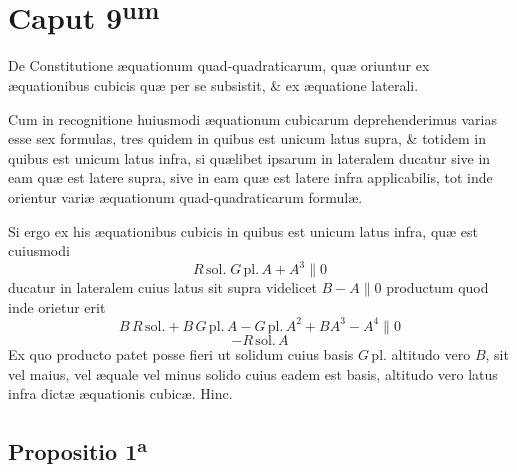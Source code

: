 \documentclass[11pt,a4paper]{article}
\begin{document}

\section*{Caput 9\textsuperscript{um}}

De Constitutione æquationum quad-quadraticarum, quæ oriuntur ex æquationibus cubicis quæ per se subsistit, \& ex æquatione laterali.

Cum in recognitione huiusmodi æquationum cubicarum deprehenderimus varias esse sex formulas, tres quidem in quibus est unicum latus supra, \& totidem in quibus est unicum latus infra, si quælibet ipsarum in lateralem ducatur sive in eam quæ est latere supra, sive in eam quæ est latere infra applicabilis, tot inde orientur variæ æquationum quad-quadraticarum formulæ.

Si ergo \struck{\ill{}}  ex his æquationibus cubicis in quibus est unicum latus infra, quæ est cuiusmodi
\[ R\,\mathrm{sol.} \; G\,\mathrm{pl.}\,A + A^3 \parallel 0 \]
ducatur in lateralem cuius latus sit supra videlicet $B - A \parallel 0$ productum quod inde orietur erit
\[ B\,R\,\mathrm{sol.} + B\,G\,\mathrm{pl.}\,A - G\,\mathrm{pl.}\,A^2 + B A^3 - A^4 \parallel 0 \]
\[ - R\,\mathrm{sol.}\,A \]
Ex quo producto patet posse fieri ut solidum cuius basis $G\,\mathrm{pl.}$ altitudo vero $B$, sit vel maius, vel æquale vel minus solido cuius eadem est basis, altitudo vero latus infra dictæ æquationis cubicæ. Hinc.

\subsection*{Propositio 1\textsuperscript{a}}
\end{document}
